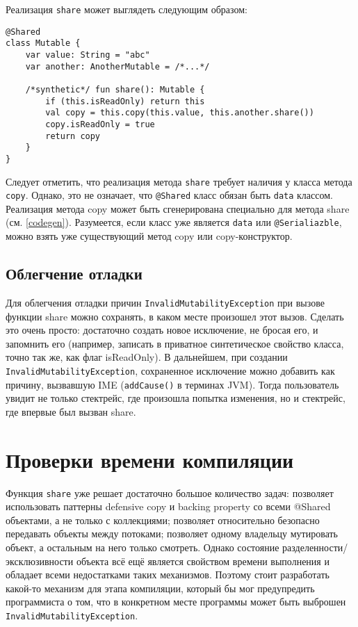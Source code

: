 \documentclass[specification,annotation,times]{itmo-student-thesis}
\begin{document}
Реализация \texttt{share} может выглядеть следующим образом:

\begin{lstlisting}[float=h!,caption={Реализация share}]
@Shared
class Mutable {
	var value: String = "abc"
	var another: AnotherMutable = /*...*/
	
	/*synthetic*/ fun share(): Mutable {
		if (this.isReadOnly) return this
		val copy = this.copy(this.value, this.another.share())
		copy.isReadOnly = true
		return copy
	}
}
\end{lstlisting}

Следует отметить, что реализация метода \texttt{share} требует наличия у класса метода \texttt{copy}.
Однако, это не означает, что \texttt{@Shared} класс обязан быть \texttt{data} классом.
Реализация метода copy может быть сгенерирована специально для метода share (см. \ref{codegen}).
Разумеется, если класс уже является \texttt{data} или \texttt{@Serialiazble}, можно взять уже существующий метод copy или copy-конструктор.

\subsection{Облегчение отладки}

Для облегчения отладки причин \texttt{InvalidMutabilityException} при вызове функции share можно сохранять, в каком месте произошел этот вызов.
Сделать это очень просто: достаточно создать новое исключение, не бросая его, и запомнить его (например, записать в приватное синтетическое свойство класса, точно так же, как флаг isReadOnly).
В дальнейшем, при создании \texttt{InvalidMutabilityException}, сохраненное исключение можно добавить как причину, вызвавшую IME (\texttt{addCause()} в терминах JVM).
Тогда пользователь увидит не только стектрейс, где произошла попытка изменения, но и стектрейс, где впервые был вызван share.

\section{Проверки времени компиляции}\label{compile_checks}

Функция \texttt{share} уже решает достаточно большое количество задач: позволяет использовать паттерны defensive copy и backing property со всеми @Shared объектами, а не только с коллекциями; позволяет относительно безопасно передавать объекты между потоками; позволяет одному владельцу мутировать объект, а остальным на него только смотреть.
Однако состояние разделенности/эксклюзивности объекта всё ещё является свойством времени выполнения и обладает всеми недостатками таких механизмов. 
Поэтому стоит разработать какой-то механизм для этапа компиляции, который бы мог предупредить программиста о том, что в конкретном месте программы может быть выброшен \texttt{InvalidMutabilityException}.
\end{document}
